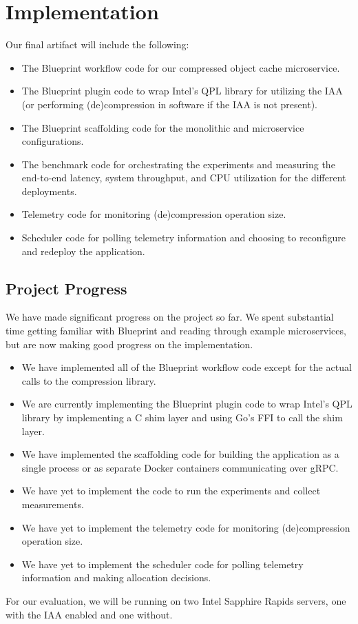 \section{Implementation}

Our final artifact will include the following:
\begin{itemize}
    \item The Blueprint workflow code for our compressed object cache microservice.
    \item The Blueprint plugin code to wrap Intel's QPL library for utilizing the IAA (or performing (de)compression in software if the IAA is not present).
    \item The Blueprint scaffolding code for the monolithic and microservice configurations.
    \item The benchmark code for orchestrating the experiments and measuring the end-to-end latency, system throughput, and CPU utilization for the different deployments.
    \item Telemetry code for monitoring (de)compression operation size.
    \item Scheduler code for polling telemetry information and choosing to reconfigure and redeploy the application.
\end{itemize}

\subsection{Project Progress}

We have made significant progress on the project so far.
We spent substantial time getting familiar with Blueprint and reading through example microservices, but are now making good progress on the implementation.
\begin{itemize}
    \item We have implemented all of the Blueprint workflow code except for the actual calls to the compression library.
    \item We are currently implementing the Blueprint plugin code to wrap Intel's QPL library by implementing a C shim layer and using Go's FFI to call the shim layer.
    \item We have implemented the scaffolding code for building the application as a single process or as separate Docker containers communicating over gRPC.
    \item We have yet to implement the code to run the experiments and collect measurements.
    \item We have yet to implement the telemetry code for monitoring (de)compression operation size.
    \item We have yet to implement the scheduler code for polling telemetry information and making allocation decisions.
\end{itemize}
For our evaluation, we will be running on two Intel Sapphire Rapids servers, one with the IAA enabled and one without.

